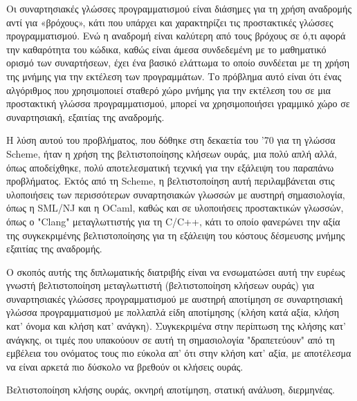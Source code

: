 \documentclass[diploma]{softlab-thesis}
\begin{document}
\begin{abstractgr}%

Οι συναρτησιακές γλώσσες προγραμματισμού είναι διάσημες για τη χρήση αναδρομής αντί για «βρόχους», 
κάτι που υπάρχει και χαρακτηρίζει τις προστακτικές γλώσσες προγραμματισμού. Ενώ η αναδρομή είναι καλύτερη από 
τους βρόχους σε ό,τι αφορά την καθαρότητα του κώδικα, καθώς είναι άμεσα συνδεδεμένη με το μαθηματικό ορισμό
των συναρτήσεων, έχει ένα βασικό ελάττωμα το οποίο συνδέεται με τη χρήση της μνήμης για την εκτέλεση των 
προγραμμάτων. Το πρόβλημα αυτό είναι ότι ένας αλγόριθμος που χρησιμοποιεί σταθερό χώρο μνήμης για την εκτέλεση του
σε μια προστακτική γλώσσα προγραμματισμού, μπορεί να χρησιμοποιήσει γραμμικό χώρο σε συναρτησιακή, εξαιτίας 
της αναδρομής.
  

Η λύση αυτού του προβλήματος, που δόθηκε στη δεκαετία του '70 για τη γλώσσα Scheme, ήταν η χρήση της βελτιστοποίησης
κλήσεων ουράς, μια πολύ απλή αλλά, όπως αποδείχθηκε, πολύ αποτελεσματική τεχνική για την εξάλειψη του παραπάνω προβλήματος.
Εκτός από τη Scheme, η βελτιστοποίηση αυτή περιλαμβάνεται στις υλοποιήσεις των περισσότερων συναρτησιακών 
γλωσσών με αυστηρή σημασιολογία, όπως η SML/NJ και η OCaml, καθώς και σε υλοποιήσεις προστακτικών 
γλωσσών, όπως ο "Clang" μεταγλωττιστής για τη C/C++, κάτι το οποίο φανερώνει την αξία της συγκεκριμένης 
βελτιστοποίησης για τη εξάλειψη του κόστους δέσμευσης μνήμης εξαιτίας της αναδρομής. 

Ο σκοπός αυτής της διπλωματικής διατριβής είναι να ενσωματώσει αυτή την ευρέως γνωστή βελτιστοποίηση 
μεταγλωττιστή (βελτιστοποίηση κλήσεων ουράς) για συναρτησιακές γλώσσες προγραμματισμού με αυστηρή αποτίμηση σε 
συναρτησιακή γλώσσα προγραμματισμού με πολλαπλά είδη αποτίμησης (κλήση κατά αξία, κλήση κατ' όνομα και 
κλήση κατ' ανάγκη). Συγκεκριμένα στην  περίπτωση της κλήσης κατ' ανάγκης, οι τιμές που υπακούουν σε αυτή τη
σημασιολογία "δραπετεύουν" από τη εμβέλεια του ονόματος τους πιο εύκολα απ' ότι στην 
κλήση κατ' αξία, με αποτέλεσμα να είναι αρκετά πιο δύσκολο να βρεθούν οι κλήσεις ουράς.


\begin{keywordsgr}
Βελτιστοποίηση κλήσης ουράς, οκνηρή αποτίμηση, στατική ανάλυση, διερμηνέας.
\end{keywordsgr}
\end{abstractgr}



\end{document}
